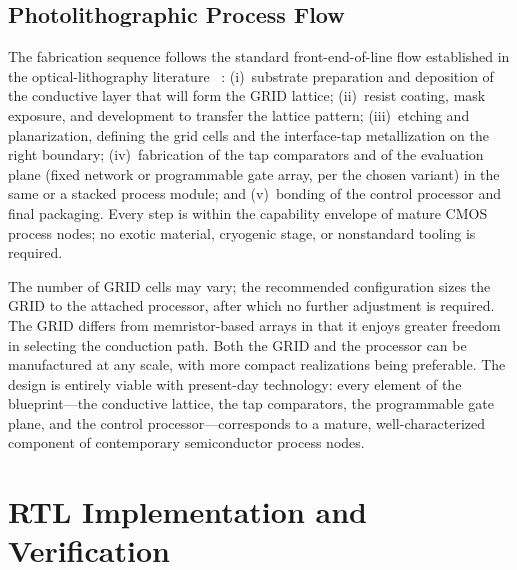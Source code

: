 \documentclass[letterpaper,journal]{IEEEtran}
\begin{document}
\subsection{Photolithographic Process Flow}
The fabrication sequence follows the standard front-end-of-line flow
established in the optical-lithography literature~
\cite{mack2007}: (i)~substrate preparation and deposition of the
conductive layer that will form the GRID lattice; (ii)~resist coating,
mask exposure, and development to transfer the lattice pattern;
(iii)~etching and planarization, defining the grid cells and the
interface-tap metallization on the right boundary; (iv)~fabrication of
the tap comparators and of the evaluation plane (fixed network or
programmable gate array, per the chosen variant) in the same or a
stacked process module; and (v)~bonding of the control processor and
final packaging. Every step is within the capability envelope of mature
CMOS process nodes; no exotic material, cryogenic stage, or nonstandard
tooling is required.

The number of GRID cells may vary; the recommended configuration sizes the
GRID to the attached processor, after which no further adjustment is
required. The GRID differs from memristor-based arrays in that it enjoys
greater freedom in selecting the conduction path. Both the GRID and the
processor can be manufactured at any scale, with more compact realizations
being preferable. The design is entirely viable with present-day technology:
every element of the blueprint---the conductive lattice, the tap
comparators, the programmable gate plane, and the control
processor---corresponds to a mature, well-characterized component of
contemporary semiconductor process nodes.

\section{RTL Implementation and Verification}
\label{sec:impl}
\end{document}

